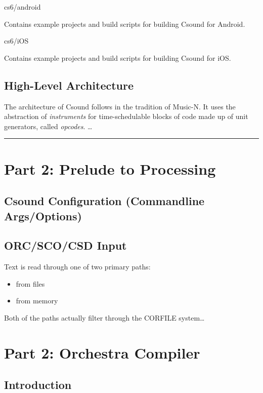 cs6/android

Contains example projects and build scripts for building Csound for
Android.

cs6/iOS

Contains example projects and build scripts for building Csound for iOS.

\subsection{High-Level Architecture}

The architecture of Csound follows in the tradition of Music-N. It uses
the abstraction of \emph{instruments} for time-schedulable blocks of
code made up of unit generators, called \emph{opcodes}. \ldots{}

\begin{center}\rule{3in}{0.4pt}\end{center}

\section{Part 2: Prelude to Processing}

\subsection{Csound Configuration (Commandline Args/Options)}

\subsection{ORC/SCO/CSD Input}

Text is read through one of two primary paths:

\begin{itemize}
\itemsep1pt\parskip0pt
\item
  from files
\item
  from memory
\end{itemize}

Both of the paths actually filter through the CORFILE system\ldots{}

\section{Part 2: Orchestra Compiler}

\subsection{Introduction}

